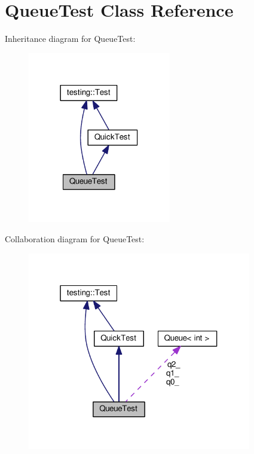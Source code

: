 \hypertarget{class_queue_test}{}\section{Queue\+Test Class Reference}
\label{class_queue_test}


Inheritance diagram for Queue\+Test\+:
\nopagebreak
\begin{figure}[H]
\begin{center}
\leavevmode
\includegraphics[width=177pt]{class_queue_test__inherit__graph}
\end{center}
\end{figure}


Collaboration diagram for Queue\+Test\+:
\nopagebreak
\begin{figure}[H]
\begin{center}
\leavevmode
\includegraphics[width=277pt]{class_queue_test__coll__graph}
\end{center}
\end{figure}
